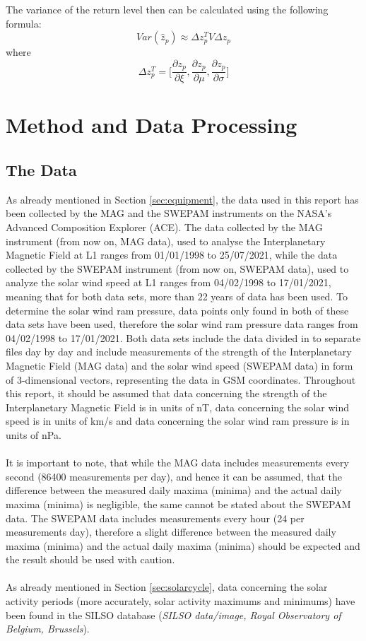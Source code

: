 \documentclass[12pt]{article}
\begin{document}
        The variance of the return level then can be calculated using the following formula:
        \begin{equation}
            Var(\hat z_p)\approx \Delta z_p^TV\Delta z_p
        \end{equation}
        where
        \begin{equation}
            \Delta z_p^T=\Bigg [\frac{\partial z_p}{\partial \xi}, \frac{\partial z_p}{\partial \mu}, \frac{\partial z_p}{\partial \sigma}\Bigg ]
        \end{equation}
\section{Method and Data Processing}\label{sec:method}
    \subsection{The Data}\label{sec:data}
        As already mentioned in Section \ref{sec:equipment}, the data used in this report has been collected by the MAG\cite{1998acemag} and the SWEPAM\cite{1998aceswepam} instruments on the NASA's Advanced Composition Explorer (ACE)\cite{1998ace}. The data collected by the MAG instrument (from now on, MAG data), used to analyse the Interplanetary Magnetic Field at L1 ranges from 01/01/1998 to 25/07/2021, while the data collected by the SWEPAM instrument (from now on, SWEPAM data), used to analyze the solar wind speed at L1 ranges from 04/02/1998 to 17/01/2021, meaning that for both data sets, more than 22 years of data has been used. To determine the solar wind ram pressure, data points only found in both of these data sets have been used, therefore the solar wind ram pressure data ranges from 04/02/1998 to 17/01/2021. Both data sets include the data divided in to separate files day by day and include measurements of the strength of the Interplanetary Magnetic Field (MAG data) and the solar wind speed (SWEPAM data) in form of 3-dimensional vectors, representing the data in GSM coordinates. Throughout this report, it should be assumed that data concerning the strength of the Interplanetary Magnetic Field is in units of nT, data concerning the solar wind speed is in units of km/s and data concerning the solar wind ram pressure is in units of nPa.\\ \\
        It is important to note, that while the MAG data includes measurements every second (86400 measurements per day), and hence it can be assumed, that the difference between the measured daily maxima (minima) and the actual daily maxima (minima) is negligible, the same cannot be stated about the SWEPAM data. The SWEPAM data includes measurements every hour (24 per measurements day), therefore a slight difference between the measured daily maxima (minima) and the actual daily maxima (minima) should be expected and the result should be used with caution.\\ \\
        As already mentioned in Section \ref{sec:solarcycle}, data concerning the solar activity periods (more accurately, solar activity maximums and minimums) have been found in the SILSO database (\textit{SILSO data/image, Royal Observatory of Belgium, Brussels}).
\end{document}
